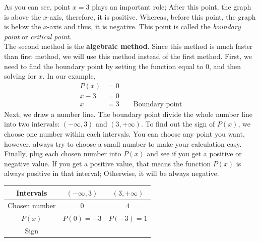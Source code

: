 As you can see, point $x=3$ plays an important role; After this point, the graph is above the $x$-axis, therefore, it is positive. Whereas, before this point, the graph is below the $x$-axis and thus, it is negative. This point is called the \textit{boundary point} or \textit{critical point}.\\
The second method is the \textbf{algebraic method}. Since this method is much faster than first method, we will use this method instead of the first method. First, we need to find the boundary point by setting the function equal to 0, and then solving for $x$. In our example,
\begin{align*}
    P(x) &= 0 \\
    x-3 & = 0 \\
    x & =3 \qquad \text{Boundary point}
\end{align*}
Next, we draw a number line. The boundary point divide the whole number line into two intervals: $(-\infty,3)$ and $(3,+\infty)$. To find out the sign of $P(x)$, we choose one number within each intervals. You can choose any point you want, however, always try to choose a small number to make your calculation easy. Finally, plug each chosen number into $P(x)$ and see if you get a positive or negative value. If you get a positive value, that means the function $P(x)$ is always positive in that interval; Otherwise, it will be always negative.
\begin{table}[ht]
\centering
\begin{tabular}{c || c  c}
    \toprule
    Intervals     & $(-\infty,3)$   & $(3,+\infty)$\\[1.5pt]
    \hline \hline
    Chosen number & $0$         &  $4$ \\
    $P(x)$        & $P(0)=-3$  & $P(-3)=1$\\[1.5pt]
    Sign          &\circled{$-$} &\circled{$+$}
\end{tabular}
\end{table}


